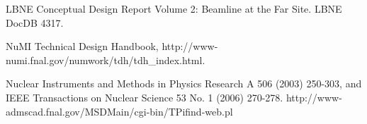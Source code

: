\begin{thebibliography}{1}

LBNE Conceptual Design Report Volume 2: Beamline at the Far Site.  LBNE DocDB 4317.

NuMI Technical Design Handbook, http://www-numi.fnal.gov/numwork/tdh/tdh\_index.html.
  
 Nuclear Instruments and Methods in Physics Research A 506 (2003) 250-303, and IEEE Transactions on Nuclear Science 53 No. 1 (2006) 270-278. http://www-admscad.fnal.gov/MSDMain/cgi-bin/TPifind-web.pl 

\end{thebibliography}




























